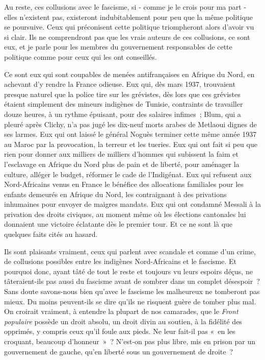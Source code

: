 \documentclass[french,twoside]{book} %
\begin{document}
\noindent Au reste, ces collusions avec le fascisme, si - comme je le crois pour ma part - elles n'existent pas, existeront indubitablement pour peu que la même politique se poursuive. Ceux qui préconisent cette politique triompheront alors d'avoir vu si clair. Ils ne comprendront pas que les vrais auteurs de ces collusions, ce sont eux, et je parle pour les membres du gouvernement respon­sables de cette politique comme pour ceux qui les ont conseillés.\par
Ce sont eux qui sont coupables de menées antifrançaises en Afrique du Nord, en achevant d'y rendre la France odieuse. Eux qui, dès mars 1937, trouvaient presque naturel que la police tire sur les grévistes, dès lors que ces grévistes étaient simplement des mineurs indigènes de Tunisie, contraints de travailler douze heures, à un rythme épuisant, pour des salaires infimes ; Blum, qui a pleuré après Clichy, n'a pas jugé les dix-neuf morts arabes de Metlaoui dignes de ses larmes. Eux qui ont laissé le général Noguès terminer cette même année 1937 au Maroc par la provocation, la terreur et les tueries. Eux qui ont fait si peu que rien pour donner aux milliers de milliers d'hommes qui subissent la faim et l'esclavage en Afrique du Nord plus de pain et de liberté, pour aménager la culture, alléger le budget, réformer le cade de l'Indigénat. Eux qui refusent aux Nord-Africains venus en France le bénéfice des allocations familiales pour les enfants demeurés en Afrique du Nord, les contraignant à des privations inhumaines pour envoyer de maigres mandats. Eux qui ont condamné Messali à la privation des droits civiques, au moment même où les élections cantonales lui donnaient une victoire éclatante dès le premier tour. Et ce ne sont là que quelques faits cités au hasard.\par
Ils sont plaisants vraiment, ceux qui parlent avec scandale et comme d'un crime, de collusions possibles entre les indigènes Nord-Africains et le fascisme. Et pourquoi donc, ayant tâté de tout le reste et toujours vu leurs espoirs déçus, ne tâteraient-ils pas aussi du fascisme avant de sombrer dans un complet désespoir ? Sans doute savons-nous bien qu'avec le fascisme les malheureux ne tomberont pas mieux. Du moins peuvent-ils se dire qu'ils ne risquent guère de tomber plus mal. On croirait vraiment, à entendre la plupart de nos camarades, que le {\itshape Front populaire} possède un droit absolu, un droit divin au soutien, à la fidélité des opprimés, y compris ceux qu'il foule aux pieds. Ne leur fait-il pas « en les croquant, beaucoup d'honneur » ? N'est-on pas plus libre, mis en prison par un gouvernement de gauche, qu'en liberté sous un gouvernement de droite ?\par
\end{document}
